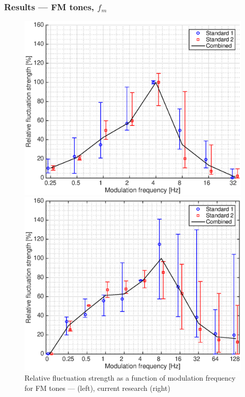 \documentclass{beamer}
\begin{document}
\begin{frame}
  \frametitle{Results --- FM tones, $f_m$}
  \begin{figure}
    \centering
    \begin{minipage}{0.45\textwidth}
      \includegraphics[width=\textwidth]{Fastl2007_FM-fm}
    \end{minipage}
    \hfill
    \begin{minipage}{0.45\textwidth}
      \includegraphics[width=\textwidth]{Garcia2015_FM-fm}
    \end{minipage}
    \caption{Relative fluctuation strength as a function of modulation
    frequency for FM tones --- \citeauthor{Fastl2007Psychoacoustics} (left),
    current research (right)}
  \end{figure}
\end{frame}
\end{document}
